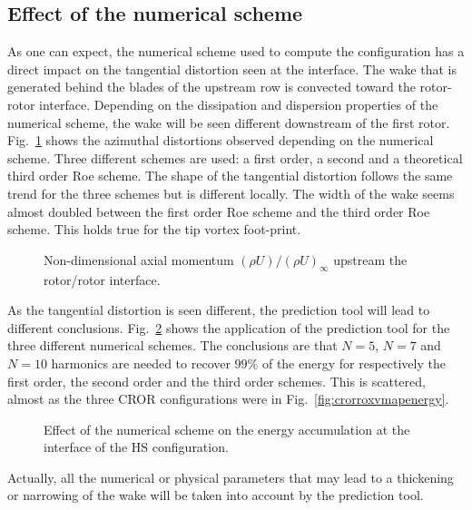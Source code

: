 \subsection{Effect of the numerical scheme}

As one can expect, the numerical scheme used to
compute the configuration has a direct impact on the tangential
distortion seen at the interface. The wake that is 
generated behind the blades of the upstream row is
convected toward the rotor-rotor interface. Depending on
the dissipation and dispersion properties of the numerical
scheme, the wake will be seen different downstream of the
first rotor. Fig.~\ref{fig:crorroxvmap_scheme} shows the azimuthal 
distortions observed depending on the numerical scheme.
Three different schemes are used: a first order, a second
and a theoretical third order Roe scheme. The shape of the
tangential distortion follows the same trend  for the three
schemes but is different locally.
The width of the wake seems almost doubled between the first order
Roe scheme and the third order Roe scheme. This holds true for the tip
vortex foot-print.
\begin{figure}[htbp]
  \centering
  \caption{Non-dimensional axial momentum $(\rho U)/(\rho U)_\infty$ 
  upstream the rotor/rotor interface.}
  \label{fig:crorroxvmap_scheme}
\end{figure}

As the tangential distortion is seen different, the prediction tool
will lead to different conclusions. Fig.~\ref{fig:crorroxvmapenergy_scheme}
shows the application of the prediction tool for the three
different numerical schemes. The conclusions are that
$N=5$, $N=7$ and $N=10$ harmonics are needed to recover 
$99\%$ of the energy for respectively the first order, the 
second order and the third order schemes. This is scattered,
almost as the three CROR configurations were in 
Fig.~\ref{fig:crorroxvmapenergy}. 
\begin{figure}[htbp]
  \centering
  \caption{Effect of the numerical scheme on the energy 
  accumulation at the interface of the \mockup HS configuration.}
  \label{fig:crorroxvmapenergy_scheme}
\end{figure}

Actually, all the numerical or physical parameters
that may lead to a thickening or narrowing of the
wake will be taken into account by the prediction tool.

